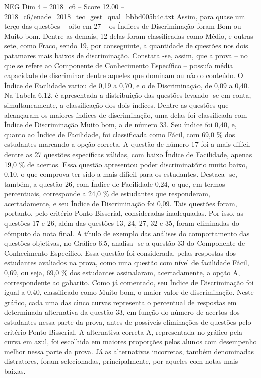 \begin{textsample}{NEG Dim 4 – 2018\_c6 – Score 12.00 – 2018\_c6/enade\_2018\_tec\_gest\_qual\_bbbd005b4c.txt}
Assim, para quase um terço das questões – oito em 27 – os Índices de Discriminação foram Bom ou Muito bom.
Dentre as demais, 12 delas foram classificadas como Médio, e outras sete, como Fraco, sendo 19, por conseguinte, a quantidade de questões nos dois patamares mais baixos de discriminação.
Constata -se, assim, que a prova – no que se refere ao Componente de Conhecimento Específico – possuía média capacidade de discriminar dentre aqueles que dominam ou não o conteúdo.
O Índice de Facilidade variou de 0,19 a 0,70, e o de Discriminação, de 0,09 a 0,40.
Na Tabela 6.12, é apresentada a distribuição das questões levando -se em conta, simultaneamente, a classificação dos dois índices.
Dentre as questões que alcançaram os maiores índices de discriminação, uma delas foi classificada com Índice de Discriminação Muito bom, a de número 33.
Seu índice foi 0,40, e, quanto ao Índice de Facilidade, foi classificada como Fácil, com 69,0 \% dos estudantes marcando a opção correta.
A questão de número 17 foi a mais difícil dentre as 27 questões específicas válidas, com baixo Índice de Facilidade, apenas 19,0 \% de acertos.
Essa questão apresentou poder discriminatório muito baixo, 0,10, o que comprova ter sido a mais difícil para os estudantes.
Destaca -se, também, a questão 26, com Índice de Facilidade 0,24, o que, em termos percentuais, corresponde a 24,0 \% de estudantes que responderam, acertadamente, e seu Índice de Discriminação foi 0,09.
Tais questões foram, portanto, pelo critério Ponto-Bisserial, consideradas inadequadas.
Por isso, as questões 17 e 26, além das questões 13, 24, 27, 32 e 35, foram eliminadas do cômputo da nota final.
A título de exemplo das análises do comportamento das questões objetivas, no Gráfico 6.5, analisa -se a questão 33 do Componente de Conhecimento Específico.
Essa questão foi considerada, pelas respostas dos estudantes avaliados na prova, como uma questão com nível de facilidade Fácil, 0,69, ou seja, 69,0 \% dos estudantes assinalaram, acertadamente, a opção A, correspondente ao gabarito.
Como já comentado, seu Índice de Discriminação foi igual a 0,40, classificado como Muito bom, o maior valor de discriminação.
Neste gráfico, cada uma das cinco curvas representa o percentual de respostas em determinada alternativa da questão 33, em função do número de acertos dos estudantes nessa parte da prova, antes de possíveis eliminações de questões pelo critério Ponto-Bisserial.
A alternativa correta A, representada no gráfico pela curva em azul, foi escolhida em maiores proporções pelos alunos com desempenho melhor nessa parte da prova.
Já as alternativas incorretas, também denominadas distratores, foram selecionadas, principalmente, por aqueles com notas mais baixas.

\end{textsample}
